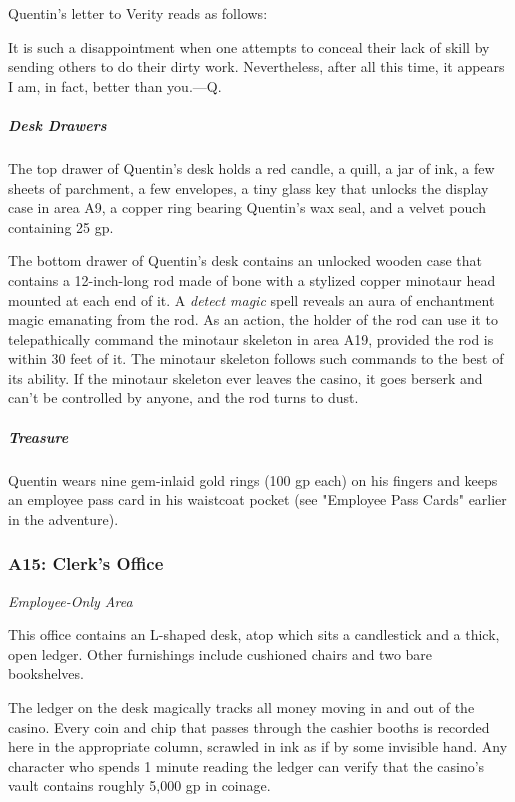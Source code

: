 \documentclass[10pt,a4paper,twoside,bg=print,twocolumn,openany,nodeprecatedcode]{dndbook}
\begin{document}
Quentin's letter to Verity reads as follows:

\begin{DndReadAloud}{}
It is such a disappointment when one attempts to conceal their lack of skill by sending others to do their dirty work. Nevertheless, after all this time, it appears I am, in fact, better than you.—Q.

\end{DndReadAloud}

\subparagraph{Desk Drawers}
The top drawer of Quentin's desk holds a red candle, a quill, a jar of ink, a few sheets of parchment, a few envelopes, a tiny glass key that unlocks the display case in area A9, a copper ring bearing Quentin's wax seal, and a velvet pouch containing 25 gp.

The bottom drawer of Quentin's desk contains an unlocked wooden case that contains a 12-inch-long rod made of bone with a stylized copper minotaur head mounted at each end of it. A \textit{detect magic} spell reveals an aura of enchantment magic emanating from the rod. As an action, the holder of the rod can use it to telepathically command the minotaur skeleton in area A19, provided the rod is within 30 feet of it. The minotaur skeleton follows such commands to the best of its ability. If the minotaur skeleton ever leaves the casino, it goes berserk and can't be controlled by anyone, and the rod turns to dust.

\subparagraph{Treasure}
Quentin wears nine gem-inlaid gold rings (100 gp each) on his fingers and keeps an employee pass card in his waistcoat pocket (see "Employee Pass Cards" earlier in the adventure).

\subsubsection{A15: Clerk's Office}
\textit{Employee-Only Area}

\begin{DndReadAloud}{}
This office contains an L-shaped desk, atop which sits a candlestick and a thick, open ledger. Other furnishings include cushioned chairs and two bare bookshelves.

\end{DndReadAloud}

The ledger on the desk magically tracks all money moving in and out of the casino. Every coin and chip that passes through the cashier booths is recorded here in the appropriate column, scrawled in ink as if by some invisible hand. Any character who spends 1 minute reading the ledger can verify that the casino's vault contains roughly 5,000 gp in coinage.
\end{document}
